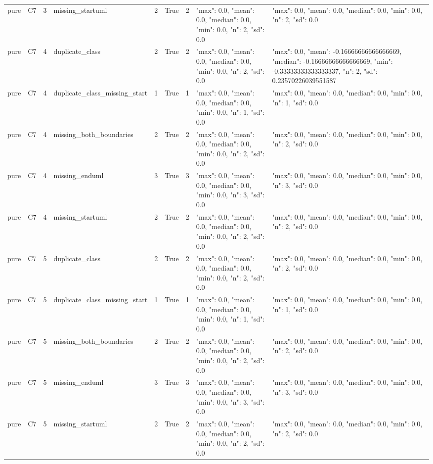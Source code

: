 \begin{tabular}{lllllllll}
pure & C7 & 3 & missing\_startuml & 2 & True & 2 & {"max": 0.0, "mean": 0.0, "median": 0.0, "min": 0.0, "n": 2, "sd": 0.0} & {"max": 0.0, "mean": 0.0, "median": 0.0, "min": 0.0, "n": 2, "sd": 0.0} \\
pure & C7 & 4 & duplicate\_class & 2 & True & 2 & {"max": 0.0, "mean": 0.0, "median": 0.0, "min": 0.0, "n": 2, "sd": 0.0} & {"max": 0.0, "mean": -0.16666666666666669, "median": -0.16666666666666669, "min": -0.33333333333333337, "n": 2, "sd": 0.23570226039551587} \\
pure & C7 & 4 & duplicate\_class\_missing\_start & 1 & True & 1 & {"max": 0.0, "mean": 0.0, "median": 0.0, "min": 0.0, "n": 1, "sd": 0.0} & {"max": 0.0, "mean": 0.0, "median": 0.0, "min": 0.0, "n": 1, "sd": 0.0} \\
pure & C7 & 4 & missing\_both\_boundaries & 2 & True & 2 & {"max": 0.0, "mean": 0.0, "median": 0.0, "min": 0.0, "n": 2, "sd": 0.0} & {"max": 0.0, "mean": 0.0, "median": 0.0, "min": 0.0, "n": 2, "sd": 0.0} \\
pure & C7 & 4 & missing\_enduml & 3 & True & 3 & {"max": 0.0, "mean": 0.0, "median": 0.0, "min": 0.0, "n": 3, "sd": 0.0} & {"max": 0.0, "mean": 0.0, "median": 0.0, "min": 0.0, "n": 3, "sd": 0.0} \\
pure & C7 & 4 & missing\_startuml & 2 & True & 2 & {"max": 0.0, "mean": 0.0, "median": 0.0, "min": 0.0, "n": 2, "sd": 0.0} & {"max": 0.0, "mean": 0.0, "median": 0.0, "min": 0.0, "n": 2, "sd": 0.0} \\
pure & C7 & 5 & duplicate\_class & 2 & True & 2 & {"max": 0.0, "mean": 0.0, "median": 0.0, "min": 0.0, "n": 2, "sd": 0.0} & {"max": 0.0, "mean": 0.0, "median": 0.0, "min": 0.0, "n": 2, "sd": 0.0} \\
pure & C7 & 5 & duplicate\_class\_missing\_start & 1 & True & 1 & {"max": 0.0, "mean": 0.0, "median": 0.0, "min": 0.0, "n": 1, "sd": 0.0} & {"max": 0.0, "mean": 0.0, "median": 0.0, "min": 0.0, "n": 1, "sd": 0.0} \\
pure & C7 & 5 & missing\_both\_boundaries & 2 & True & 2 & {"max": 0.0, "mean": 0.0, "median": 0.0, "min": 0.0, "n": 2, "sd": 0.0} & {"max": 0.0, "mean": 0.0, "median": 0.0, "min": 0.0, "n": 2, "sd": 0.0} \\
pure & C7 & 5 & missing\_enduml & 3 & True & 3 & {"max": 0.0, "mean": 0.0, "median": 0.0, "min": 0.0, "n": 3, "sd": 0.0} & {"max": 0.0, "mean": 0.0, "median": 0.0, "min": 0.0, "n": 3, "sd": 0.0} \\
pure & C7 & 5 & missing\_startuml & 2 & True & 2 & {"max": 0.0, "mean": 0.0, "median": 0.0, "min": 0.0, "n": 2, "sd": 0.0} & {"max": 0.0, "mean": 0.0, "median": 0.0, "min": 0.0, "n": 2, "sd": 0.0} \\

\end{tabular}
